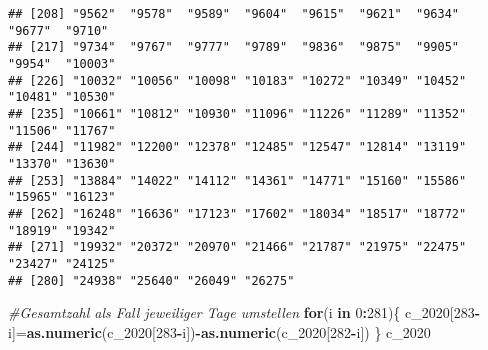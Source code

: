 \documentclass[
]{article}
\newenvironment{Shaded}{\begin{snugshade}}{\end{snugshade}}
\newcommand{\CommentTok}[1]{\textcolor[rgb]{0.56,0.35,0.01}{\textit{#1}}}
\newcommand{\ControlFlowTok}[1]{\textcolor[rgb]{0.13,0.29,0.53}{\textbf{#1}}}
\newcommand{\DecValTok}[1]{\textcolor[rgb]{0.00,0.00,0.81}{#1}}
\newcommand{\KeywordTok}[1]{\textcolor[rgb]{0.13,0.29,0.53}{\textbf{#1}}}
\newcommand{\NormalTok}[1]{#1}
\newcommand{\OperatorTok}[1]{\textcolor[rgb]{0.81,0.36,0.00}{\textbf{#1}}}
\begin{document}
\begin{verbatim}
## [208] "9562"  "9578"  "9589"  "9604"  "9615"  "9621"  "9634"  "9677"  "9710" 
## [217] "9734"  "9767"  "9777"  "9789"  "9836"  "9875"  "9905"  "9954"  "10003"
## [226] "10032" "10056" "10098" "10183" "10272" "10349" "10452" "10481" "10530"
## [235] "10661" "10812" "10930" "11096" "11226" "11289" "11352" "11506" "11767"
## [244] "11982" "12200" "12378" "12485" "12547" "12814" "13119" "13370" "13630"
## [253] "13884" "14022" "14112" "14361" "14771" "15160" "15586" "15965" "16123"
## [262] "16248" "16636" "17123" "17602" "18034" "18517" "18772" "18919" "19342"
## [271] "19932" "20372" "20970" "21466" "21787" "21975" "22475" "23427" "24125"
## [280] "24938" "25640" "26049" "26275"
\end{verbatim}

\begin{Shaded}
\begin{Highlighting}[]
\CommentTok{#Gesamtzahl als Fall jeweiliger Tage umstellen}
\ControlFlowTok{for}\NormalTok{(i }\ControlFlowTok{in} \DecValTok{0}\OperatorTok{:}\DecValTok{281}\NormalTok{)\{}
\NormalTok{  c_}\DecValTok{2020}\NormalTok{[}\DecValTok{283}\OperatorTok{-}\NormalTok{i]=}\KeywordTok{as.numeric}\NormalTok{(c_}\DecValTok{2020}\NormalTok{[}\DecValTok{283}\OperatorTok{-}\NormalTok{i])}\OperatorTok{-}\KeywordTok{as.numeric}\NormalTok{(c_}\DecValTok{2020}\NormalTok{[}\DecValTok{282}\OperatorTok{-}\NormalTok{i])}
\NormalTok{\}}
\NormalTok{c_}\DecValTok{2020}
\end{Highlighting}
\end{Shaded}
\end{document}
